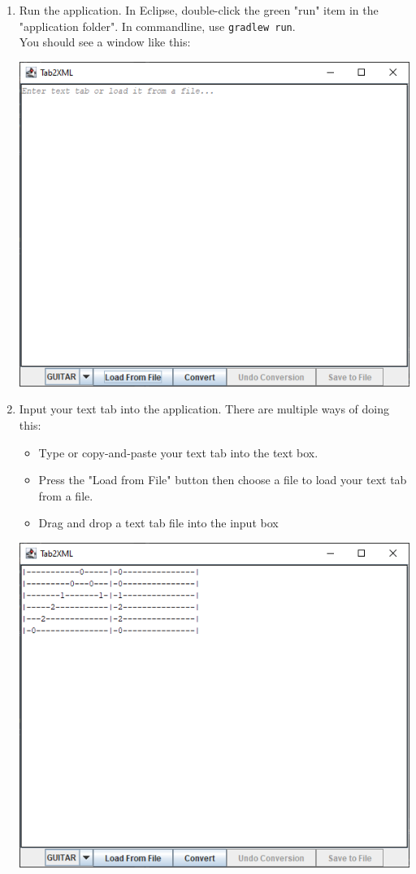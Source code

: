 \documentclass[11pt]{article}
\begin{document}
\begin{enumerate}
\item Run the application.  In Eclipse, double-click the green "run" item in the "application folder".  In commandline, use \texttt{gradlew run}.\\
You should see a window like this:
\begin{center}
\includegraphics[width=.9\linewidth]{../Screenshots/main-interface.png}
\end{center}
\item Input your text tab into the application.  There are multiple ways of doing this:
\begin{itemize}
\item Type or copy-and-paste your text tab into the text box.
\item Press the "Load from File" button then choose a file to load your text tab from a file.
\item Drag and drop a text tab file into the input box
\end{itemize}
\begin{center}
\includegraphics[width=.9\linewidth]{../Screenshots/text-tab.png}

\end{center}
\end{enumerate}
\end{document}
